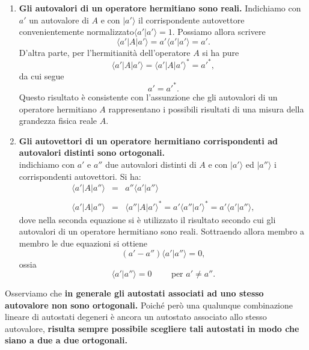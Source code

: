 \documentclass[a4paper,12pt,oneside]{book}
\begin{document}
\begin{enumerate}
\item \textbf{Gli autovalori di un operatore hermitiano sono reali.} Indichiamo con $a'$ un autovalore di $A$ e con $\vert a' \rangle $ il corrispondente autovettore convenientemente normalizzato$\langle a' \vert a' \rangle =1 $. Possiamo allora scrivere
\begin{equation}
\langle a' \vert A \vert a' \rangle = a' \langle a' \vert a' \rangle = a'.
\end{equation}
D'altra parte, per l'hermitianità dell'operatore $A$ si ha pure
\begin{equation}
\langle a' \vert A \vert a' \rangle = \langle a' \vert A \vert a' \rangle  ^* = a'^*,
\end{equation}
da cui segue
\begin{equation}
a'=a'^* .
\end{equation}
Questo risultato è consistente con l'assunzione che gli autovalori di un operatore hermitiano $A$ rappresentano i possibili risultati di una misura della grandezza fisica reale $A$.
\item \textbf{Gli autovettori di un operatore hermitiano corrispondenti ad autovalori distinti sono ortogonali.}\\
indichiamo con $a' $ e $a''$ due autovalori distinti di $A$ e con $\vert a' \rangle$ ed $\vert a'' \rangle$ i corrispondenti autovettori. Si ha:
\begin{eqnarray}
\langle a' \vert A \vert a'' \rangle & = & a'' \langle a' \vert a'' \rangle  \nonumber \\
\\
\langle a' \vert A \vert a'' \rangle & = & \langle a'' \vert A \vert a' \rangle ^* = a' \langle a'' \vert a' \rangle ^* = a' \langle a' \vert a'' \rangle , \nonumber 
\end{eqnarray}
dove nella seconda equazione si è utilizzato il risultato secondo cui gli autovalori di un operatore hermitiano sono reali. Sottraendo allora membro a membro le due equazioni si ottiene
\begin{equation}
(a'-a'') \langle a' \vert a'' \rangle =0,
\end{equation}
ossia
\begin{equation}
\langle a' \vert a'' \rangle =0 \qquad \textrm{ per } a' \neq a'' .
\end{equation}
\end{enumerate}
Osserviamo che \textbf{in generale gli autostati associati ad uno stesso autovalore non sono ortogonali.} Poiché però una qualunque combinazione lineare di autostati degeneri è ancora un autostato associato allo stesso autovalore, \textbf{risulta sempre possibile scegliere tali autostati in modo che siano a due a due ortogonali.}\\
\end{document}
